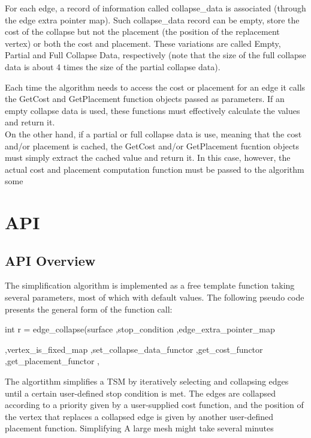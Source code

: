 For each edge, a record of information called collapse_data is associated (through the edge extra pointer map). Such collapse_data record can be empty, store the cost of the collapse but not the placement (the position of the replacement vertex) or both the cost and placement. These variations are called Empty, Partial and Full Collapse Data, respectively (note that the size of the full collapse data is about 4 times the size of the partial collapse data).

Each time the algorithm needs to access the cost or placement for an edge it calls the GetCost and GetPlacement function objects passed as parameters. If an empty collapse data is used, these functions must effectively calculate the values and return it.\\
On the other hand, if a partial or full collapse data is use, meaning that the cost and/or placement is cached, the GetCost and/or GetPlacement fucntion objects must simply extract the cached value and return it. In this case, however, the actual cost and placement computation function must be passed to the algorithm some


 





\section{API}

\subsection{API Overview}

The simplification algorithm is implemented as a free template function taking several parameters, most of which with default values.
The following pseudo code presents the general form of the function call:

int r = edge_collapse(surface
                     ,stop_condition
					 ,edge_extra_pointer_map
					 
					 ,vertex_is_fixed_map
					 ,set_collapse_data_functor
					 ,get_cost_functor
					 ,get_placement_functor
					 ,

The algortithm simplifies a TSM by iteratively selecting and collapsing edges until a certain user-defined stop condition is met. The edges are collapsed according to a priority given by a user-supplied cost function, and the position of the vertex that replaces a collapsed edge is given by another user-defined placement function.
Simplifying A large mesh might take several minutes 



